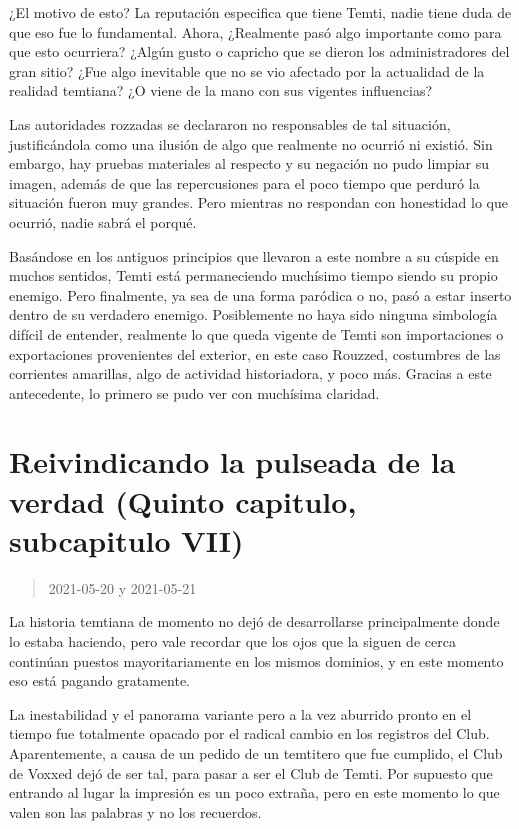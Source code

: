 \documentclass[
  spanish,
]{book}
\begin{document}
¿El motivo de esto?
La reputación especifica que tiene Temti, nadie tiene duda de que eso fue lo fundamental. Ahora, ¿Realmente pasó algo importante como para que esto ocurriera? ¿Algún gusto o capricho que se dieron los administradores del gran sitio? ¿Fue algo inevitable que no se vio afectado por la actualidad de la realidad temtiana? ¿O viene de la mano con sus vigentes influencias?

Las autoridades rozzadas se declararon no responsables de tal situación, justificándola como una ilusión de algo que realmente no ocurrió ni existió. Sin embargo, hay pruebas materiales al respecto y su negación no pudo limpiar su imagen, además de que las repercusiones para el poco tiempo que perduró la situación fueron muy grandes. Pero mientras no respondan con honestidad lo que ocurrió, nadie sabrá el porqué.

Basándose en los antiguos principios que llevaron a este nombre a su cúspide en muchos sentidos, Temti está permaneciendo muchísimo tiempo siendo su propio enemigo. Pero finalmente, ya sea de una forma paródica o no, pasó a estar inserto dentro de su verdadero enemigo. Posiblemente no haya sido ninguna simbología difícil de entender, realmente lo que queda vigente de Temti son importaciones o exportaciones provenientes del exterior, en este caso Rouzzed, costumbres de las corrientes amarillas, algo de actividad historiadora, y poco más. Gracias a este antecedente, lo primero se pudo ver con muchísima claridad.

\hypertarget{reivindicando-la-pulseada-de-la-verdad-quinto-capitulo-subcapitulo-vii}{%
\section{Reivindicando la pulseada de la verdad (Quinto capitulo, subcapitulo VII)}\label{reivindicando-la-pulseada-de-la-verdad-quinto-capitulo-subcapitulo-vii}}

\begin{quote}
2021-05-20 y 2021-05-21
\end{quote}

La historia temtiana de momento no dejó de desarrollarse principalmente donde lo estaba haciendo, pero vale recordar que los ojos que la siguen de cerca continúan puestos mayoritariamente en los mismos dominios, y en este momento eso está pagando gratamente.

La inestabilidad y el panorama variante pero a la vez aburrido pronto en el tiempo fue totalmente opacado por el radical cambio en los registros del Club. Aparentemente, a causa de un pedido de un temtitero que fue cumplido, el Club de Voxxed dejó de ser tal, para pasar a ser el Club de Temti. Por supuesto que entrando al lugar la impresión es un poco extraña, pero en este momento lo que valen son las palabras y no los recuerdos.
\end{document}
